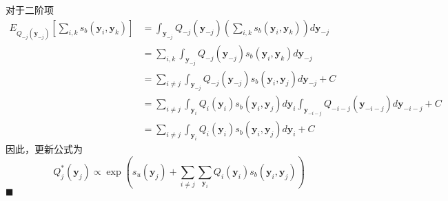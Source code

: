 对于二阶项
\begin{equation}
    \begin{split}
        E_{Q_{-j}(\boldsymbol{y}_{-j})}\left[\sum_{i,k} s_b(\boldsymbol{y}_i,\boldsymbol{y}_k) \right] &=\int_{\boldsymbol{y}_{-j}} Q_{-j}(\boldsymbol{y}_{-j})\left(\sum_{i,k} s_b(\boldsymbol{y}_i,\boldsymbol{y}_k) \right) d\boldsymbol{y}_{-j}\\
        &=\sum_{i,k}\int_{\boldsymbol{y}_{-j}} Q_{-j}(\boldsymbol{y}_{-j})s_b(\boldsymbol{y}_i,\boldsymbol{y}_k) d\boldsymbol{y}_{-j}\\
        &=\sum_{i\neq j}{\int_{\boldsymbol{y}_{-j}}Q_{-j}(\boldsymbol{y}_{-j}) s_b(\boldsymbol{y}_i,\boldsymbol{y}_j)  d\boldsymbol{y}_{-j}} +C\\
        &=\sum_{i\neq j}{\int_{\boldsymbol{y}_i}Q_{i}(\boldsymbol{y}_i) s_b(\boldsymbol{y}_i,\boldsymbol{y}_j)  d\boldsymbol{y}_i}{\int_{\boldsymbol{y}_{-i-j}}Q_{{-i-j}}(\boldsymbol{y}_{-i-j})   d\boldsymbol{y}_{-i-j}} +C\\
        &=\sum_{i\neq j}{\int_{\boldsymbol{y}_i}Q_{i}(\boldsymbol{y}_i) s_b(\boldsymbol{y}_i,\boldsymbol{y}_j)  d\boldsymbol{y}_i} +C
    \end{split}
\end{equation}
因此，更新公式为
\begin{equation}
    {Q^{\ast}_j(\boldsymbol{y}_j)}\propto \exp\left(s_u(\boldsymbol{y}_j) + \sum_{i\neq j}{\sum_{\boldsymbol{y}_i}Q_{i}(\boldsymbol{y}_i) s_b(\boldsymbol{y}_i,\boldsymbol{y}_j)} \right)
\end{equation}
$\blacksquare$
